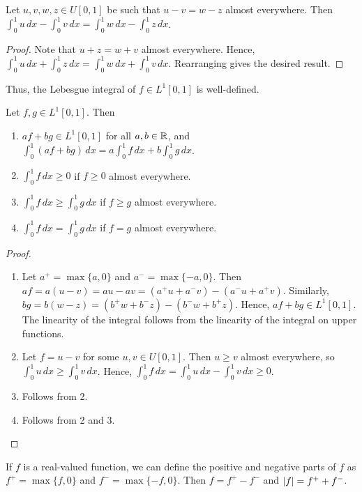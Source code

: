 \begin{theorem}
    Let $u,v,w,z \in U[0,1]$ be such that $u-v = w-z$ almost everywhere. Then $\int_{0}^{1} u \, dx - \int_{0}^{1} v \, dx = \int_{0}^{1} w \, dx - \int_{0}^{1} z \, dx$.
\end{theorem}
\begin{proof}
    Note that $u+z = w+v$ almost everywhere. Hence, $\int_{0}^{1} u \, dx + \int_{0}^{1} z \, dx = \int_{0}^{1} w \, dx + \int_{0}^{1} v \, dx$. Rearranging gives the desired result.
\end{proof}
Thus, the Lebesgue integral of $f \in L^{1}[0,1]$ is well-defined. 

\begin{theorem}
    Let $f,g \in L^{1}[0,1]$. Then
    \begin{enumerate}
        \item $af+bg \in L^{1}[0,1]$ for all $a,b \in \mathbb{R}$, and $\int_{0}^{1} (af+bg) \, dx = a\int_{0}^{1} f \, dx + b\int_{0}^{1} g \, dx$.
        \item $\int_{0}^{1} f \, dx \geq 0$ if $f \geq 0$ almost everywhere.
        \item $\int_{0}^{1} f \, dx \geq \int_{0}^{1} g \, dx$ if $f \geq g$ almost everywhere.
        \item $\int_{0}^{1} f\, dx = \int_{0}^{1} g \, dx$ if $f = g$ almost everywhere.
    \end{enumerate}
\end{theorem}

\begin{proof}
    \begin{enumerate}
        \item Let $a^{+} = \max\{a,0\}$ and $a^{-} = \max\{-a,0\}$. Then $af = a(u-v) = au-av = (a^{+}u+a^{-}v) - (a^{-}u+a^{+}v)$. Similarly, $bg = b(w-z) = (b^{+}w+b^{-}z) - (b^{-}w+b^{+}z)$. Hence, $af+bg \in L^{1}[0,1]$. The linearity of the integral follows from the linearity of the integral on upper functions.
        \item Let $f = u-v$ for some $u,v \in U[0,1]$. Then $u \geq v$ almost everywhere, so $\int_{0}^{1} u \, dx \geq \int_{0}^{1} v \, dx$. Hence, $\int_{0}^{1} f \, dx = \int_{0}^{1} u \, dx - \int_{0}^{1} v \, dx \geq 0$.
        \item Follows from 2.
        \item Follows from 2 and 3.
    \end{enumerate}
\end{proof}

If $f$ is a real-valued function, we can define the positive and negative parts of $f$ as $f^{+} = \max\{f,0\}$ and $f^{-} = \max\{-f,0\}$. Then $f = f^{+}-f^{-}$ and $\left| f \right| = f^{+}+f^{-}$.


